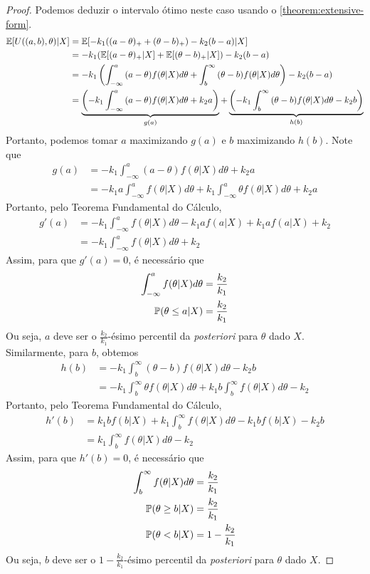 \begin{proof}
 Podemos deduzir o intervalo ótimo neste caso
 usando o \cref{theorem:extensive-form}. 
 \begin{align*}
  \E[U((a,b),\theta)|X]	
  &= \E[-k_{1}((a-\theta)_{+} +(\theta-b)_{+}) 
  -k_{2}(b-a)|X] \\
  &= -k_{1}(\E[(a-\theta)_{+}|X]+\E[(\theta-b)_{+}|X]) 
  -k_{2}(b-a) \\
  &= -k_{1}\left(\int_{-\infty}^{a}{(a-\theta)f(\theta|X)d\theta}
  +\int_{b}^{\infty}{(\theta-b)f(\theta|X)d\theta}\right)
  -k_{2}(b-a) \\
  &=  \underbrace{\left(-k_{1}\int_{-\infty}^{a}{(a-\theta)f(\theta|X)d\theta}+k_{2}a\right)}_{g(a)} + \underbrace{\left(-k_{1}\int_{b}^{\infty}{(\theta-b)f(\theta|X)d\theta}-k_{2}b\right)}_{h(b)}
 \end{align*}
 Portanto, podemos tomar $a$ maximizando $g(a)$ e
 $b$ maximizando $h(b)$.
 Note que
 \begin{align*}
  g(a)	
  &= -k_{1}\int_{-\infty}^{a}{(a-\theta)f(\theta|X)d\theta}+k_{2}a \\
  &= -k_{1}a\int_{-\infty}^{a}{f(\theta|X)d\theta}+k_{1}\int_{-\infty}^{a}{\theta f(\theta|X)d\theta}+k_{2}a
 \end{align*}
 Portanto, pelo Teorema Fundamental do Cálculo,
 \begin{align*}
  g'(a)	&= -k_{1}\int_{-\infty}^{a}{f(\theta|X)d\theta} -k_{1}af(a|X) +k_{1}af(a|X) + k_{2} \\
  &= -k_{1}\int_{-\infty}^{a}{f(\theta|X)d\theta} + k_{2}
 \end{align*}
 Assim, para que $g'(a) = 0$, é necessário que
 \begin{align*}
  \int_{-\infty}^{a}{f(\theta|X)d\theta}
  &= \frac{k_{2}}{k_{1}} \\
  \P(\theta \leq a|X)
  &= \frac{k_{2}}{k_{1}}
 \end{align*}
 Ou seja, $a$ deve ser o 
 $\frac{k_2}{k_1}$-ésimo percentil da 
 \emph{posteriori} para $\theta$ dado $X$.
 Similarmente, para $b$, obtemos 
 \begin{align*}
  h(b)	
  &= -k_{1}\int_{b}^{\infty}
  {(\theta-b)f(\theta|X)d\theta}-k_{2}b	\\
  &= -k_{1}\int_{b}^{\infty}{\theta f(\theta|X)d\theta}
  +k_{1}b\int_{b}^{\infty}{f(\theta|X)d\theta} -k_{2}
 \end{align*}
 Portanto, pelo Teorema Fundamental do Cálculo,
 \begin{align*}
  h'(b)	&= k_{1}bf(b|X)+k_{1}\int_{b}^{\infty}{f(\theta|X)d\theta}-k_{1}bf(b|X) - k_{2}b \\
  &= k_{1}\int_{b}^{\infty}{f(\theta|X)d\theta} -k_{2}
 \end{align*}
 Assim, para que $h'(b) = 0$, é necessário que
 \begin{align*}
  \int_{b}^{\infty}{f(\theta|X)d\theta}
  &= \frac{k_2}{k_1} \\
  \P(\theta \geq b|X)
  &= \frac{k_2}{k_1} \\
  \P(\theta < b|X)										
  &= 1-\frac{k_2}{k_1}
 \end{align*}
 Ou seja, $b$ deve ser o 
 $1-\frac{k_2}{k_1}$-ésimo percentil da 
 \emph{posteriori} para $\theta$ dado $X$.
\end{proof}
